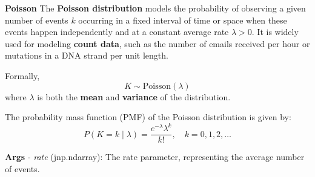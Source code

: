 \documentclass[
  letterpaper,
  DIV=11,
  numbers=noendperiod]{scrartcl}
\begin{document}
\textbf{Poisson} The \textbf{Poisson distribution} models the
probability of observing a given number of events \(k\) occurring in a
fixed interval of time or space when these events happen independently
and at a constant average rate \(\lambda > 0\). It is widely used for
modeling \textbf{count data}, such as the number of emails received per
hour or mutations in a DNA strand per unit length.

Formally, \[
  K \sim \text{Poisson}(\lambda)
  \] where \(\lambda\) is both the \textbf{mean} and \textbf{variance}
of the distribution.

The probability mass function (PMF) of the Poisson distribution is given
by: \[
  P(K = k \mid \lambda) =
  \frac{e^{-\lambda} \lambda^k}{k!},
  \quad k = 0, 1, 2, \dots
  \]

\textbf{Args} - \emph{rate} (jnp.ndarray): The rate parameter,
representing the average number of events.
\end{document}
